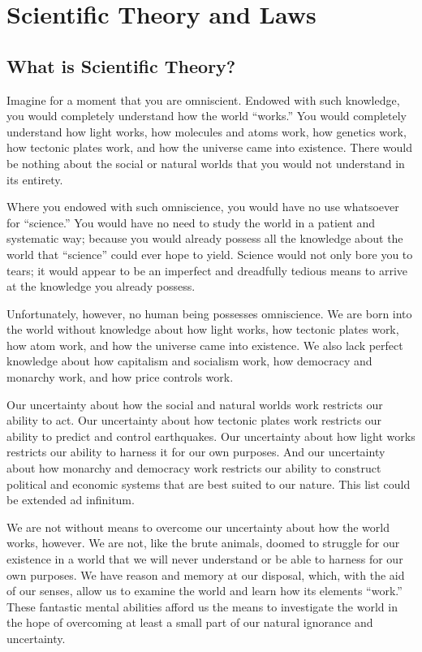\section{Scientific Theory and Laws}

\subsection{What is Scientific Theory?}

Imagine for a moment that you are omniscient. Endowed with such knowledge, you would completely understand how the world ``works.''  You would completely understand how light works, how molecules and atoms work, how genetics work, how tectonic plates work, and how the universe came into existence. There would be nothing about the social or natural worlds that you would not understand in its entirety.

Where you endowed with such omniscience, you would have no use whatsoever for ``science.''  You would have no need to study the world in a patient and systematic way; because you would already possess all the knowledge about the world that ``science'' could ever hope to yield. Science would not only bore you to tears; it would appear to be an imperfect and dreadfully tedious means to arrive at the knowledge you already possess.

Unfortunately, however, no human being possesses omniscience. We are born into the world without knowledge about how light works, how tectonic plates work, how atom work, and how the universe came into existence. We also lack perfect knowledge about how capitalism and socialism work, how democracy and monarchy work, and how price controls work.

Our uncertainty about how the social and natural worlds work restricts our ability to act. Our uncertainty about how tectonic plates work restricts our ability to predict and control earthquakes. Our uncertainty about how light works restricts our ability to harness it for our own purposes. And our uncertainty about how monarchy and democracy work restricts our ability to construct political and economic systems that are best suited to our nature. This list could be extended ad infinitum.

We are not without means to overcome our uncertainty about how the world works, however. We are not, like the brute animals, doomed to struggle for our existence in a world that we will never understand or be able to harness for our own purposes. We have reason and memory at our disposal, which, with the aid of our senses, allow us to examine the world and learn how its elements ``work.'' These fantastic mental abilities afford us the means to investigate the world in the hope of overcoming at least a small part of our natural ignorance and uncertainty.

